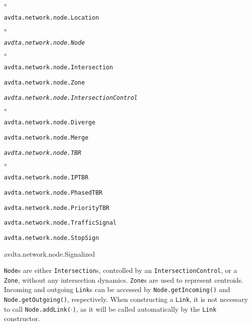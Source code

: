 \begin{list}{$\circ$}{}
	\item \texttt{avdta.network.node.Location}
	\begin{list}{$\circ$}{}
		\item \texttt{\textit{avdta.network.node.Node}}	
		
		\begin{list}{$\circ$}{}
			\item \texttt{avdta.network.node.Intersection}
			\item \texttt{avdta.network.node.Zone}
		\end{list}	
	\end{list}

	\item \texttt{\textit{avdta.network.node.IntersectionControl}}
	
	\begin{list}{$\circ$}{}
		
		\item \texttt{avdta.network.node.Diverge}
		
		\item \texttt{avdta.network.node.Merge}
		
		\item \texttt{\textit{avdta.network.node.TBR}}
		
		\begin{list}{$\circ$}{}
			\item \texttt{avdta.network.node.IPTBR}
			
			\item \texttt{avdta.network.node.PhasedTBR}
			
			\item \texttt{avdta.network.node.PriorityTBR}
		\end{list}
		
		\item \texttt{avdta.network.node.TrafficSignal}
		
		
		\item \texttt{avdta.network.node.StopSign}
	\end{list}

	\item{avdta.network.node.Signalized}

\end{list}
\texttt{Node}s are either \texttt{Intersection}s, controlled by an \texttt{IntersectionControl}, or a \texttt{Zone}, without any intersection dynamics. \texttt{Zone}s are used to represent centroids. 
%
Incoming and outgoing \texttt{Link}s can be accessed by \texttt{Node.getIncoming()} and \texttt{Node.getOutgoing()}, respectively.
When constructing a \texttt{Link}, it is not necessary to call \texttt{Node.addLink($\cdot$)}, as it will be called automatically by the \texttt{Link} constructor.

